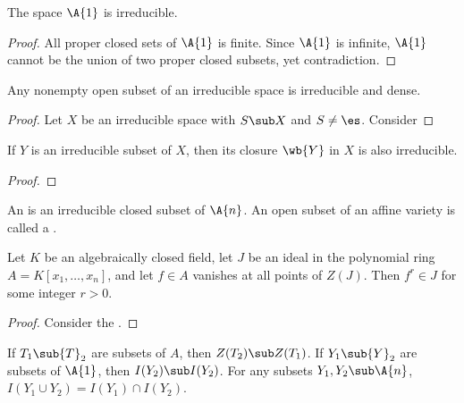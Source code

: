 \documentclass[10pt]{article}
\begin{document}
\begin{example}
    The space $\A{1}$ is irreducible.
\end{example}
\begin{proof}
    All proper closed sets of $\A{1}$ is finite. Since $\A{1}$ is infinite, $\A{1}$ cannot be the union of two proper closed subsets, yet contradiction.
\end{proof}
\begin{example}
    Any nonempty open subset of an irreducible space is irreducible and dense.
\end{example}
\begin{proof}
    Let $X$ be an irreducible space with $S\sub X$ and $S\ne\es$. Consider 
\end{proof}
\begin{example}
    If $Y$ is an irreducible subset of $X$, then its closure $\wb{Y}$ in $X$ is also irreducible.
\end{example}
\begin{proof}
    
\end{proof}
\begin{definition}
    An  is an irreducible closed subset of $\A{n}$. An open subset of an affine variety is called a .
\end{definition}





\begin{theorem}
    Let $K$ be an algebraically closed field, let $J$ be an ideal in the polynomial ring $A=K[{x}_{1},\dots,{x}_{n}]$, and let $f\in A$ vanishes at all points of $Z(J)$. Then ${f}^{r}\in J$ for some integer $r>0$.
\end{theorem}
\begin{proof}
    Consider the . 
\end{proof}








\begin{proposition}
    If ${T}_{1}\sub{T}_{2}$ are subsets of $A$, then $Z({T}_{2})\sub Z({T}_{1})$. If ${Y}_{1}\sub{Y}_{2}$ are subsets of $\A{1}$, then $I({Y}_{2})\sub I({Y}_{2})$. For any subsets ${Y}_{1},{Y}_{2}\sub\A{n}$, $I({Y}_{1}\cup{Y}_{2})=I({Y}_{1})\cap I({Y}_{2})$. 
\end{proposition}





\hindex
\end{document}
